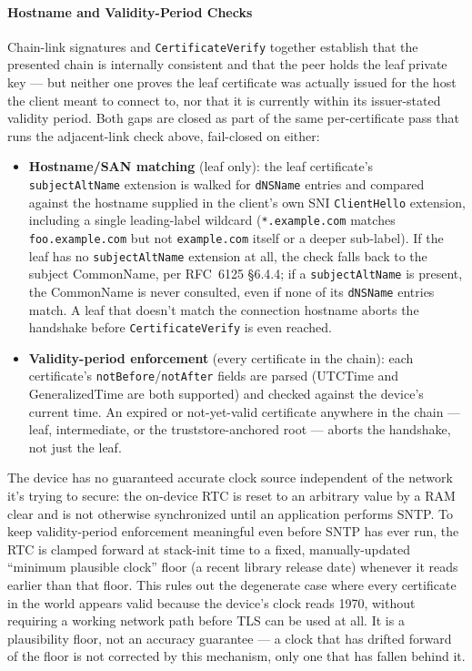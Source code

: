 \documentclass[titlepage]{report}
\begin{document}
	\paragraph{Hostname and Validity-Period Checks}
	Chain-link signatures and \texttt{CertificateVerify} together establish that the presented chain is internally consistent and that the peer holds the leaf private key --- but neither one proves the leaf certificate was actually issued for the host the client meant to connect to, nor that it is currently within its issuer-stated validity period. Both gaps are closed as part of the same per-certificate pass that runs the adjacent-link check above, fail-closed on either:
	\begin{itemize}
		\item \textbf{Hostname/SAN matching} (leaf only): the leaf certificate's \texttt{subjectAltName} extension is walked for \texttt{dNSName} entries and compared against the hostname supplied in the client's own SNI \texttt{ClientHello} extension, including a single leading-label wildcard (\texttt{*.example.com} matches \texttt{foo.example.com} but not \texttt{example.com} itself or a deeper sub-label). If the leaf has no \texttt{subjectAltName} extension at all, the check falls back to the subject CommonName, per RFC~6125 \S6.4.4; if a \texttt{subjectAltName} is present, the CommonName is never consulted, even if none of its \texttt{dNSName} entries match. A leaf that doesn't match the connection hostname aborts the handshake before \texttt{CertificateVerify} is even reached.
		\item \textbf{Validity-period enforcement} (every certificate in the chain): each certificate's \texttt{notBefore}/\texttt{notAfter} fields are parsed (UTCTime and GeneralizedTime are both supported) and checked against the device's current time. An expired or not-yet-valid certificate anywhere in the chain --- leaf, intermediate, or the truststore-anchored root --- aborts the handshake, not just the leaf.
	\end{itemize}
	The device has no guaranteed accurate clock source independent of the network it's trying to secure: the on-device RTC is reset to an arbitrary value by a RAM clear and is not otherwise synchronized until an application performs SNTP. To keep validity-period enforcement meaningful even before SNTP has ever run, the RTC is clamped forward at stack-init time to a fixed, manually-updated ``minimum plausible clock'' floor (a recent library release date) whenever it reads earlier than that floor. This rules out the degenerate case where every certificate in the world appears valid because the device's clock reads 1970, without requiring a working network path before TLS can be used at all. It is a plausibility floor, not an accuracy guarantee --- a clock that has drifted forward of the floor is not corrected by this mechanism, only one that has fallen behind it.
\end{document}
